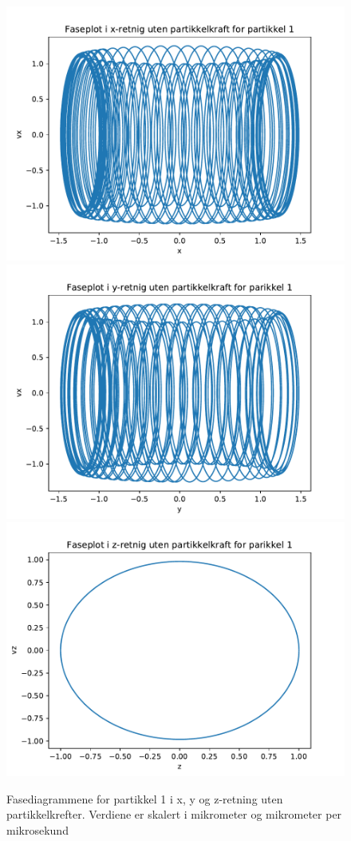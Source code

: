 \documentclass[reprint,english,notitlepage, nofootinbib]{revtex4-1}  %
\begin{document}
\begin{figure}[H]
	\centering 
	\includegraphics[scale=0.4]{../pythonplots/xnoint1.pdf}
	\includegraphics[scale=0.4]{../pythonplots/ynoint1.pdf}
	\includegraphics[scale=0.4]{../pythonplots/znoint1.pdf}
	\caption{Fasediagrammene for partikkel 1 i x, y og z-retning uten partikkelkrefter. Verdiene er skalert i mikrometer og mikrometer per mikrosekund}
	\label{Fig:fasenoint1}
\end{figure}
\end{document}

